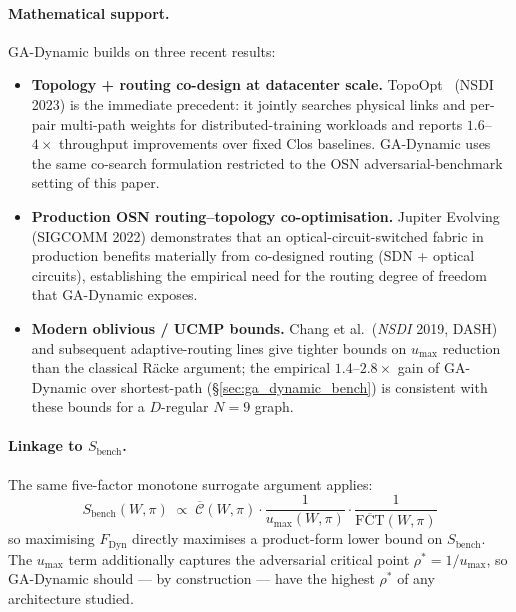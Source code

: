 \documentclass{article}
\begin{document}
    \paragraph{Mathematical support.}  GA-Dynamic builds on three recent results:
    \begin{itemize}
        \item \textbf{Topology + routing co-design at datacenter scale.}  TopoOpt~\cite{wang2023topoopt} (NSDI 2023) is the immediate precedent: it jointly searches physical links and per-pair multi-path weights for distributed-training workloads and reports $1.6$--$4\times$ throughput improvements over fixed Clos baselines.  GA-Dynamic uses the same co-search formulation restricted to the OSN adversarial-benchmark setting of this paper.
        \item \textbf{Production OSN routing--topology co-optimisation.}  Jupiter Evolving~\cite{poutievski2022jupiter} (SIGCOMM 2022) demonstrates that an optical-circuit-switched fabric in production benefits materially from co-designed routing (SDN + optical circuits), establishing the empirical need for the routing degree of freedom that GA-Dynamic exposes.
        \item \textbf{Modern oblivious / UCMP bounds.}  Chang et al.\ (\emph{NSDI} 2019, DASH) and subsequent adaptive-routing lines give tighter bounds on $u_{\max}$ reduction than the classical Räcke argument; the empirical $1.4$--$2.8\times$ gain of GA-Dynamic over shortest-path (\S\ref{sec:ga_dynamic_bench}) is consistent with these bounds for a $D$-regular $N=9$ graph.
    \end{itemize}

    \paragraph{Linkage to $S_{\text{bench}}$.}  The same five-factor monotone surrogate argument applies:
    \[
        S_{\text{bench}}(W,\pi) \;\propto\; \overline{\mathcal{C}}(W,\pi) \cdot \frac{1}{u_{\max}(W,\pi)} \cdot \frac{1}{\overline{\mathrm{FCT}}(W,\pi)}
    \]
    so maximising $F_{\text{Dyn}}$ directly maximises a product-form lower bound on $S_{\text{bench}}$.  The $u_{\max}$ term additionally captures the adversarial critical point $\rho^* = 1/u_{\max}$, so GA-Dynamic should --- by construction --- have the highest $\rho^*$ of any architecture studied.
\end{document}
